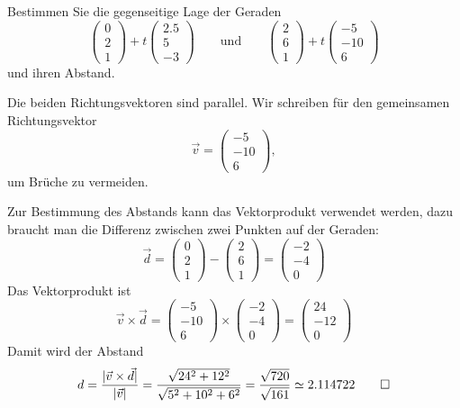 Bestimmen Sie die gegenseitige Lage der Geraden
\[
\begin{pmatrix}0\\2\\1\end{pmatrix}
+t
\begin{pmatrix}2.5\\5\\-3\end{pmatrix}
\qquad
\text{und}
\qquad
\begin{pmatrix}2\\6\\1\end{pmatrix}
+t
\begin{pmatrix}-5\\-10\\6\end{pmatrix}
\]
und ihren Abstand.

\begin{loesung}
Die beiden Richtungsvektoren sind parallel.
Wir schreiben für den gemeinsamen Richtungsvektor
\[
\vec v=
\begin{pmatrix}-5\\-10\\6\end{pmatrix},
\]
um Brüche zu vermeiden.

Zur Bestimmung des
Abstands kann das Vektorprodukt verwendet werden, dazu braucht man
die Differenz zwischen zwei Punkten auf der Geraden:
\[
\vec d=
\begin{pmatrix}0\\2\\1\end{pmatrix}
-\begin{pmatrix}2\\6\\1\end{pmatrix}
=
\begin{pmatrix}-2\\-4\\0\end{pmatrix}
\]
Das Vektorprodukt ist
\[
\vec v\times \vec d
=
\begin{pmatrix}-5\\-10\\6\end{pmatrix}
\times
\begin{pmatrix}-2\\-4\\0\end{pmatrix}
=
\begin{pmatrix}24\\-12\\0\end{pmatrix}
\]
Damit wird der Abstand
\begin{align*}
d
=
\frac{|\vec v\times \vec d|}{|\vec v|}
=\frac{\sqrt{24^2+12^2}}{\sqrt{5^2+10^2+6^2}}
=\frac{\sqrt{720}}{\sqrt{161}}
\simeq 2.114722
\qedhere
\end{align*}
\end{loesung}

